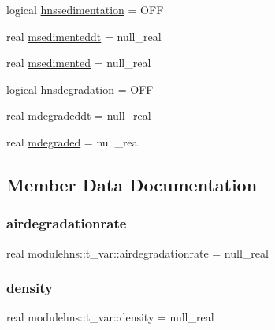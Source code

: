 \begin{DoxyCompactItemize}
logical \mbox{\hyperlink{structmodulehns_1_1t__var_ab4efccea42a4a796c32b128a15be18bf}{hnssedimentation}} = O\+FF
\item 
real \mbox{\hyperlink{structmodulehns_1_1t__var_a9b46d48157ecd68de355e30603609ac9}{msedimenteddt}} = null\+\_\+real
\item 
real \mbox{\hyperlink{structmodulehns_1_1t__var_abbeb01826469fe2963b5387f5f90663b}{msedimented}} = null\+\_\+real
\item 
logical \mbox{\hyperlink{structmodulehns_1_1t__var_ac7739c602f4a3f0fdedcf5e3d7bdd657}{hnsdegradation}} = O\+FF
\item 
real \mbox{\hyperlink{structmodulehns_1_1t__var_a4e459b503e9d1a3ae11b9461a27d44c5}{mdegradeddt}} = null\+\_\+real
\item 
real \mbox{\hyperlink{structmodulehns_1_1t__var_ad77e1e6a511132a76a61e0340296c7c6}{mdegraded}} = null\+\_\+real
\end{DoxyCompactItemize}


\subsection{Member Data Documentation}
\mbox{\label{structmodulehns_1_1t__var_a9074441d9b16de5004cb4ac3b0cb0c64}} 
\subsubsection{\texorpdfstring{airdegradationrate}{airdegradationrate}}
{\footnotesize\ttfamily real modulehns\+::t\+\_\+var\+::airdegradationrate = null\+\_\+real\hspace{0.3cm}{\ttfamily [private]}}

\mbox{\label{structmodulehns_1_1t__var_ab4fdced0d128ebfd37c07e8fd52f309d}} 
\subsubsection{\texorpdfstring{density}{density}}
{\footnotesize\ttfamily real modulehns\+::t\+\_\+var\+::density = null\+\_\+real\hspace{0.3cm}{\ttfamily [private]}}

